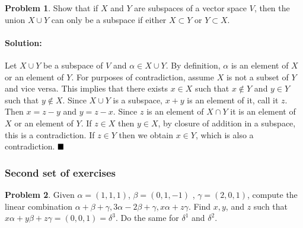 \documentclass[]{article}
\theoremstyle{definition}
\newtheorem{problem}{Problem}
\newenvironment{solution}{\paragraph{Solution:}}{\hfill$\blacksquare \\$}
\begin{document}
\begin{problem}
	Show that if $X$ and $Y$ are subspaces of a vector space $V$, then the union $X \cup Y$ can only be a subspace if either $X \subset Y$ or $Y \subset X$.
\end{problem}
\begin{solution}
	Let $X \cup Y$ be a subspace of $V$ and $\alpha \in X \cup Y$. By definition, $\alpha$ is an element of $X$ or an element of $Y$. For purposes of contradiction, assume $X$ is not a subset of $Y$ and vice versa. This implies that there exists $x \in X$ such that $x \notin Y$ and $y \in Y$ such that $y \notin X$. Since $X \cup Y$ is a subspace, $x+y$ is an element of it, call it $z$. Then $x = z -y$ and $y = z - x$. Since $z$ is an element of $X \cap Y$ it is an element of $X$ or an element of $Y$. If $z \in X$ then $y \in X$, by closure of addition in a subspace, this is a contradiction. If $z \in Y$ then we obtain $x \in Y$, which is also a contradiction.
\end{solution}
\subsubsection{Second set of exercises}
\begin{problem} Given  $ \alpha = (1,1,1) $,  $ \beta = (0,1,-1) $  ,  $ \gamma = (2,0,1) $, compute the linear combination  $ \alpha + \beta + \gamma, 3\alpha - 2\beta + \gamma, x\alpha + z\gamma $. Find  $ x,y $, and  $ z $  such that  $ x\alpha + y\beta + z\gamma = (0,0,1) = \delta^3$. Do the same for  $ \delta^1 $  and  $ \delta^2 $.      
\end{problem}
\end{document}
